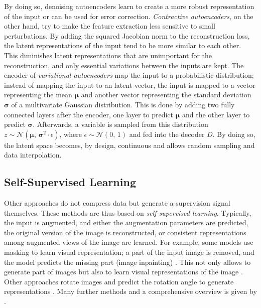 By doing so, denoising autoencoders learn to create a more robust representation of the input or can be used for error correction.
\emph{Contractive autoencoders}, on the other hand, try to make the feature extraction less sensitive to small perturbations.
By adding the squared Jacobian norm to the reconstruction loss, the latent representations of the input tend to be more similar to each other.
This diminishes latent representations that are unimportant for the reconstruction, and only essential variations between the inputs are kept.
The encoder of \emph{variational autoencoders} map the input to a probabilistic distribution; instead of mapping the input to an latent vector, the input is mapped to a vector representing the mean $\boldsymbol{\mu}$ and another vector representing the standard deviation $\boldsymbol{\sigma}$ of a multivariate Gaussian distribution.
This is done by adding two fully connected layers after the encoder, one layer to predict $\boldsymbol{\mu}$ and the other layer to predict $\boldsymbol{\sigma}$.
Afterwards, a variable is sampled from this distribution $z \sim \mathcal{N}(\boldsymbol{\mu},\, \boldsymbol{\sigma}^{2} \cdot \epsilon)$, where $\epsilon \sim \mathcal{N}(0,\,1)$  and fed into the decoder $D$.
By doing so, the latent space becomes, by design, continuous and allows random sampling and data interpolation.



\subsection{Self-Supervised Learning}
Other approaches do not compress data but generate a supervision signal themselves.
These methods are thus based on \emph{self-supervised learning}.
Typically, the input is augmented, and either the augmentation parameters are predicted, the original version of the image is reconstructed, or consistent representations among augmented views of the image are learned.
For example, some models use masking to learn visual representation;
a part of the input image is removed, and the model predicts the missing part (image inpainting) \cite{Elharrouss_Almaadeed_Al-Maadeed_Akbari_2020}.
This not only allows to generate part of images but also to learn visual representations of the image .
Other approaches rotate images and predict the rotation angle to generate representations .
Many further methods and a comprehensive overview is given by .

